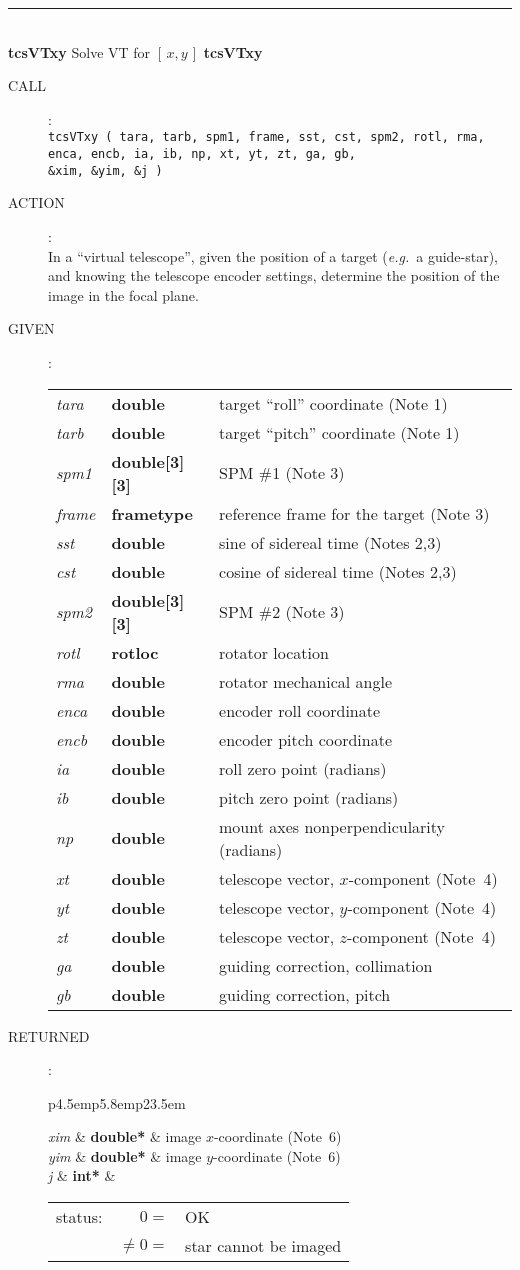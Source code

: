 \documentclass[12pt,fleqn,twoside]{article}
\renewcommand{\_}{{\tt\char'137}}     %
\newcommand{\xy}        {$[\,x,y\,]$}
\newcommand{\routine}[2]
{
  \newpage
  \rule{\textwidth}{0.3mm}\\ \nopagebreak
  {\Large {\bf #1} \hfill #2 \hfill {\bf #1}}
  \vspace{-1ex}
}
\newcommand{\call}[1]
{
  \goodbreak
  \begin{description}
    \item[CALL]: \\[0.5ex] \nopagebreak
        {\tt #1}
  \end{description}
  \vspace{-3ex}
}
\newcommand{\action}[1]
{
  \goodbreak
  \begin{description}
    \item[ACTION]: \\[0.5ex] \nopagebreak
        #1
  \end{description}
  \vspace{-3ex}
}
\newcommand{\args}[2]
{
  \goodbreak
  \begin{description}
  \item[#1]: \\[1.5ex] \nopagebreak
    \hspace*{-0.9em}
    \begin{tabular}{p{4.5em}p{5.8em}p{23.5em}}
      #2
    \end{tabular}
  \end{description}
  \vspace{-3ex}
}
\newcommand{\spec}[3]
{
  {\em {#1}} & {\bf \mbox{#2}} & {#3}
}
\begin{document}
\routine{tcsVTxy}{Solve VT for \xy}
\label{tcsVTxy}
\call{tcsVTxy ( tara, tarb, spm1, frame, sst, cst, spm2, rotl, rma, \\
\hspace*{4.5em} enca, encb, ia, ib, np, xt, yt, zt, ga, gb, \\
\hspace*{4.5em} \&xim, \&yim, \&j ) }
\action{In a ``virtual telescope'', given the
        position of a target ({\it e.g.}~a
        guide-star), and knowing the telescope encoder settings, determine
        the position of the image in the focal plane.}
\args{GIVEN}
{
\spec{tara}{double}{target ``roll'' coordinate (Note 1)} \\
\spec{tarb}{double}{target ``pitch'' coordinate (Note 1)} \\
\spec{spm1}{double[3][3]}{SPM \#1 (Note 3)} \\
\spec{frame}{{\sc frametype}}{reference frame for the target (Note 3)} \\
\spec{sst}{double}{sine of sidereal time (Notes 2,3)} \\
\spec{cst}{double}{cosine of sidereal time (Notes 2,3)} \\
\spec{spm2}{double[3][3]}{SPM \#2 (Note 3)} \\
\spec{rotl}{{\sc rotloc}}{rotator location} \\
\spec{rma}{double}{rotator mechanical angle} \\
\spec{enca}{double}{encoder roll coordinate } \\
\spec{encb}{double}{encoder pitch coordinate} \\
\spec{ia}{double}{roll zero point (radians)} \\
\spec{ib}{double}{pitch zero point (radians)} \\
\spec{np}{double}{mount axes nonperpendicularity (radians)} \\
\spec{xt}{double}{telescope vector, $x$-component (Note~4)} \\
\spec{yt}{double}{telescope vector, $y$-component (Note~4)} \\
\spec{zt}{double}{telescope vector, $z$-component (Note~4)} \\
\spec{ga}{double}{guiding correction, collimation} \\
\spec{gb}{double}{guiding correction, pitch}
}
\args{RETURNED}
{
\spec{xim}{double*}{image $x$-coordinate (Note~6)} \\
\spec{yim}{double*}{image $y$-coordinate (Note~6)} \\
\spec{j}{int*}{\hspace{-2ex}
               \begin{tabular}[t]{lrl}
                  status: & $  0 = $ & OK \\
                          & $ \neq 0 = $ & star cannot be imaged
               \end{tabular}
              }
}
\end{document}

